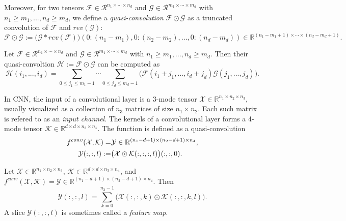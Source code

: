 Moreover, for two tensors $\mathcal{F}\in\mathcal{R}^{n_1\times\cdots\times n_d}$ and $\mathcal{G}\in\mathcal{R}^{m_1\times\cdots\times m_d}$ with $n_1\ge m_1,...,n_d\ge m_d$, we define a \textit{quasi-convolution} $\mathcal{F}\odot\mathcal{G}$ as a truncated convolution of $\mathcal{F}$ and $rev(\mathcal{G})$:
\begin{equation}
\label{eqconv}
\mathcal{F}\odot\mathcal{G} := \big(\mathcal{G}\ast rev(\mathcal{F})\big)(0:(n_1-m_1), 0:(n_2-m_2),...,0:(n_d-m_d))\in\mathbb{R}^{(n_1-m_1+1)\times\cdots\times(n_d-m_d+1)}.
\end{equation}
\begin{lemma}
\label{lqconv}
Let $\mathcal{F}\in\mathcal{R}^{n_1\times\cdots\times n_d}$ and $\mathcal{G}\in\mathcal{R}^{m_1\times\cdots\times m_d}$ with $n_1\ge m_1,...,n_d\ge m_d$. Then their quasi-convoltion $\mathcal{H}:=\mathcal{F}\odot\mathcal{G}$ can be computed as
\begin{equation}
\mathcal{H}(i_1,...,i_d) =
\sum_{0\le j_1\le m_1-1}\cdots\sum_{0\le j_d\le m_d-1}\big(\mathcal{F}(i_1+j_1,...,i_d+j_d)\mathcal{G}(j_1,...,j_d)\big).
\end{equation}
\end{lemma}
In CNN, the input of a convolutional layer is a 3-mode tensor $\mathcal{X}\in\mathbb{R}^{n_1\times n_2\times n_3}$, usually visualized as a collection of $n_3$ matrices of size $n_1\times n_2$. Each such matrix is refered to as an \textit{input channel}. The kernels of a convolutional layer forms a 4-mode tensor $\mathcal{K}\in\mathbb{R}^{d\times d\times n_3\times n_4}$. The function is defined as a quasi-convolution
\begin{equation}
\label{econv}
\aligned
f^{conv}(\mathcal{X}, \mathcal{K}) =& \mathcal{Y}\in\mathbb{R}^{(n_1-d+1)\times (n_2-d+1)\times n_4},\\
\mathcal{Y}(:,:,l) :=& \big(\mathcal{X}\odot\mathcal{K}(:,:,:,l)\big)(:,:,0).
\endaligned
\end{equation}
\begin{lemma}
Let $\mathcal{X}\in\mathbb{R}^{n_1\times n_2\times n_3}$, $\mathcal{K}\in\mathbb{R}^{d\times d\times n_3\times n_4}$, and $f^{conv}(\mathcal{X}, \mathcal{K}) = \mathcal{Y}\in\mathbb{R}^{(n_1-d+1)\times (n_2-d+1)\times n_4}$. Then
\begin{equation}
\label{e2dconv}
\mathcal{Y}(:,:,l) = \sum_{k=0}^{n_3-1}\big(\mathcal{X}(:,:,k)\odot\mathcal{K}(:,:,k,l)\big).
\end{equation}
A slice $\mathcal{Y}(:,:,l)$ is sometimes called a \textit{feature map}.
\end{lemma}


